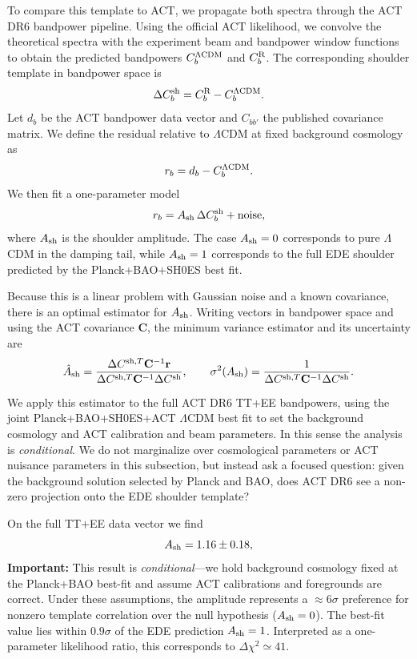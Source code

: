 \documentclass[a4paper,11pt]{article}
\begin{document}
To compare this template to ACT, we propagate both spectra through the ACT DR6 bandpower pipeline. Using the official ACT likelihood, we convolve the theoretical spectra with the experiment beam and bandpower window functions to obtain the predicted bandpowers $C_b^{\Lambda{\rm CDM}}$ and $C_b^{\rm R}$. The corresponding shoulder template in bandpower space is
\begin{equation}
\Delta C_b^{\rm sh} = C_b^{\rm R} - C_b^{\Lambda{\rm CDM}}.
\end{equation}
Let $d_b$ be the ACT bandpower data vector and $C_{bb'}$ the published covariance matrix. We define the residual relative to $\Lambda$CDM at fixed background cosmology as
\begin{equation}
r_b = d_b - C_b^{\Lambda{\rm CDM}}.
\end{equation}
We then fit a one-parameter model
\begin{equation}
r_b = A_{\rm sh}\,\Delta C_b^{\rm sh} + \text{noise},
\end{equation}
where $A_{\rm sh}$ is the shoulder amplitude. The case $A_{\rm sh}=0$ corresponds to pure $\Lambda$CDM in the damping tail, while $A_{\rm sh}=1$ corresponds to the full EDE shoulder predicted by the Planck+BAO+SH0ES best fit.

Because this is a linear problem with Gaussian noise and a known covariance, there is an optimal estimator for $A_{\rm sh}$. Writing vectors in bandpower space and using the ACT covariance $\mathbf{C}$, the minimum variance estimator and its uncertainty are
\begin{equation}
\hat A_{\rm sh} = \frac{\Delta C^{{\rm sh},T} \mathbf{C}^{-1} \mathbf{r}}{\Delta C^{{\rm sh},T} \mathbf{C}^{-1} \Delta C^{\rm sh}}, \qquad
\sigma^2(A_{\rm sh}) = \frac{1}{\Delta C^{{\rm sh},T} \mathbf{C}^{-1} \Delta C^{\rm sh}}.
\end{equation}

We apply this estimator to the full ACT DR6 TT+EE bandpowers, using the joint Planck+BAO+SH0ES+ACT $\Lambda$CDM best fit to set the background cosmology and ACT calibration and beam parameters. In this sense the analysis is \emph{conditional}. We do not marginalize over cosmological parameters or ACT nuisance parameters in this subsection, but instead ask a focused question: given the background solution selected by Planck and BAO, does ACT DR6 see a non-zero projection onto the EDE shoulder template?

On the full TT+EE data vector we find
\begin{equation}
A_{\rm sh} = 1.16 \pm 0.18,
\end{equation}
\textbf{Important:} This result is \emph{conditional}---we hold background cosmology fixed at the Planck+BAO best-fit and assume ACT calibrations and foregrounds are correct. Under these assumptions, the amplitude represents a $\approx 6\sigma$ preference for nonzero template correlation over the null hypothesis ($A_{\rm sh} = 0$). The best-fit value lies within $0.9\sigma$ of the EDE prediction $A_{\rm sh}=1$. Interpreted as a one-parameter likelihood ratio, this corresponds to $\Delta\chi^2 \simeq 41$.
\end{document}
